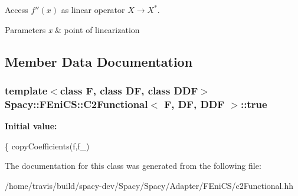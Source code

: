 Access $f''(x)$ as linear operator $X\rightarrow X^*$. 


\begin{DoxyParams}{Parameters}
{\em x} & point of linearization \\
\hline
\end{DoxyParams}


\subsection{Member Data Documentation}
\hypertarget{classSpacy_1_1FEniCS_1_1C2Functional_a048ac2c11fa15c6d5fb5ad0f20b86fc4}{
\subsubsection[{true}]{\setlength{\rightskip}{0pt plus 5cm}template$<$class F, class D\-F, class D\-D\-F$>$ {\bf Spacy\-::\-F\-Eni\-C\-S\-::\-C2\-Functional}$<$ F, D\-F, D\-D\-F $>$\-::true}}\label{classSpacy_1_1FEniCS_1_1C2Functional_a048ac2c11fa15c6d5fb5ad0f20b86fc4}
{\bfseries Initial value\-:}
\begin{DoxyCode}
\{
        copyCoefficients(f,f\_)
\end{DoxyCode}


The documentation for this class was generated from the following file\-:\begin{DoxyCompactItemize}
\item 
/home/travis/build/spacy-\/dev/\-Spacy/\-Spacy/\-Adapter/\-F\-Eni\-C\-S/c2\-Functional.\-hh\end{DoxyCompactItemize}
